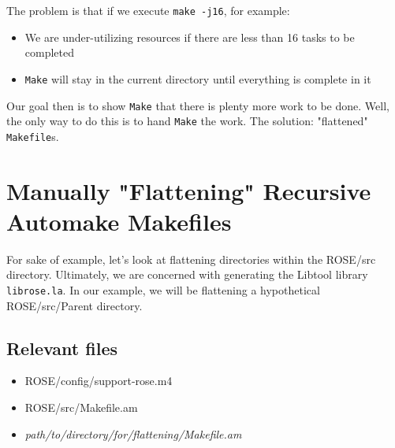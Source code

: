 The problem is that if we execute \texttt{make -j16}, for example:

    \begin{itemize}
    \item{We are under-utilizing resources if there are less than 16 tasks to be completed}
    \item{\texttt{Make} will stay in the current directory until everything is complete in it}
    \end{itemize}

Our goal then is to show \texttt{Make} that there is plenty more work to be done. Well, the only way to do
this is to hand \texttt{Make} the work. The solution: "flattened" \texttt{Makefile}s. 

%

    \section{Manually "Flattening" Recursive Automake Makefiles}

%
For sake of example, let's look at flattening directories within the ROSE/src directory.
Ultimately, we are concerned with generating the Libtool library \texttt{librose.la}. In
our example, we will be flattening a hypothetical ROSE/src/Parent directory.
\subsection{Relevant files}
	\begin{itemize}
	\item{ROSE/config/support-rose.m4}
	\item{ROSE/src/Makefile.am}
	\item{\textsl{path/to/directory/for/flattening/Makefile.am}}
	\end{itemize}
